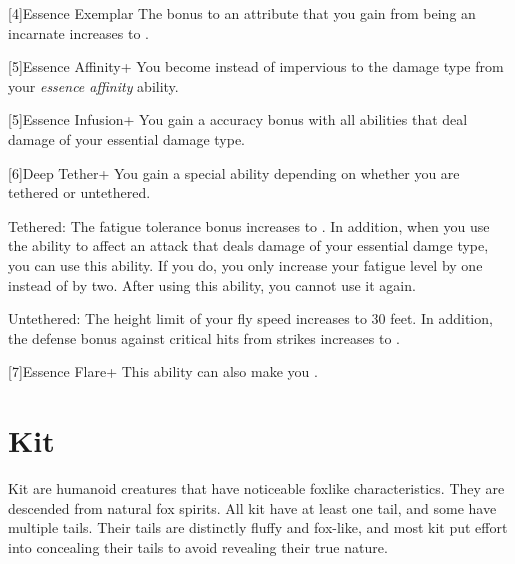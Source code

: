     [4]{Essence Exemplar} The bonus to an attribute that you gain from being an incarnate increases to .

    [5]{Essence Affinity+} You become  instead of impervious to the damage type from your \textit{essence affinity} ability.

    [5]{Essence Infusion+} You gain a  accuracy bonus with all abilities that deal damage of your essential damage type.

    [6]{Deep Tether+} You gain a special ability depending on whether you are tethered or untethered.
    \begin{raggeditemize}
        \item Tethered: The fatigue tolerance bonus increases to .
            In addition, when you use the  ability to affect an attack that deals damage of your essential damge type, you can use this ability.
            If you do, you only increase your fatigue level by one instead of by two.
            After using this ability, you  cannot use it again.
        \item Untethered: The height limit of your fly speed increases to 30 feet.
            In addition, the defense bonus against critical hits from strikes increases to .
    \end{raggeditemize}

    [7]{Essence Flare+} This ability can also make you  .

\section{Kit}

    Kit are humanoid creatures that have noticeable foxlike characteristics.
    They are descended from natural fox spirits.
    All kit have at least one tail, and some have multiple tails.
    Their tails are distinctly fluffy and fox-like, and most kit put effort into concealing their tails to avoid revealing their true nature.

